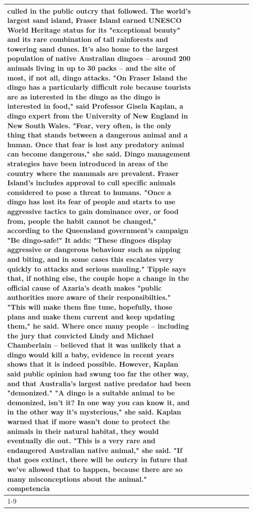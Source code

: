 \begin{table}[H]
\begin{tabular}{lllrlllll}
culled in the public outcry that followed. The world's largest sand island, Fraser Island earned UNESCO World Heritage status for its "exceptional beauty" and its rare combination of tall rainforests and towering sand dunes. It's also home to the largest population of native Australian dingoes -- around 200 animals living in up to 30 packs -- and the site of most, if not all, dingo attacks. "On Fraser Island the dingo has a particularly difficult role because tourists are as interested in the dingo as the dingo is interested in food," said Professor Gisela Kaplan, a dingo expert from the University of New England in New South Wales. "Fear, very often, is the only thing that stands between a dangerous animal and a human. Once that fear is lost any predatory animal can become dangerous," she said. Dingo management strategies have been introduced in areas of the country where the mammals are prevalent. Fraser Island's includes approval to cull specific animals considered to pose a threat to humans. "Once a dingo has lost its fear of people and starts to use aggressive tactics to gain dominance over, or food from, people the habit cannot be changed," according to the Queensland government's campaign "Be dingo-safe!" It adds: "These dingoes display aggressive or dangerous behaviour such as nipping and biting, and in some cases this escalates very quickly to attacks and serious mauling." Tipple says that, if nothing else, the couple hope a change in the official cause of Azaria's death makes "public authorities more aware of their responsibilties." "This will make them fine tune, hopefully, those plans and make them current and keep updating them," he said. Where once many people -- including the jury that convicted Lindy and Michael Chamberlain -- believed that it was unlikely that a dingo would kill a baby, evidence in recent years shows that it is indeed possible. However, Kaplan said public opinion had swung too far the other way, and that Australia's largest native predator had been "demonized." "A dingo is a suitable animal to be demonized, isn't it? In one way you can know it, and in the other way it's mysterious," she said. Kaplan warned that if more wasn't done to protect the animals in their natural habitat, they would eventually die out. "This is a very rare and endangered Australian native animal," she said. "If that goes extinct, there will be outcry in future that we've allowed that to happen, because there are so many misconceptions about the animal." competencia \\
\cline{1-9}

\end{tabular}
\end{table}
